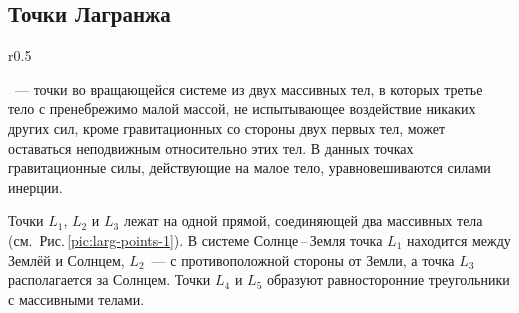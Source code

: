 \subsection{Точки Лагранжа}

\begin{wrapfigure}[12]{r}{0.5\tw}
	\centering
	\vspace{-.7pc}
	\label{pic:larg-points-1}
\end{wrapfigure}
~--- точки во вращающейся системе из двух массивных тел, в которых третье тело с пренебрежимо малой массой, не испытывающее воздействие никаких других сил, кроме гравитационных со стороны двух первых тел, может оставаться неподвижным относительно этих тел. В данных точках гравитационные силы, действующие на малое тело, уравновешиваются силами инерции.

Точки $L_1$, $L_2$ и $L_3$ лежат на одной прямой,
соединяющей два массивных тела (см.~Рис.\,\ref{pic:larg-points-1}).
В системе Солнце\,--\,Земля точка $L_1$ находится между Землёй и
Солнцем, $L_2$~--- с противоположной стороны от Земли, а точка
$L_3$ располагается за Солнцем. Точки $L_4$ и $L_5$
образуют равносторонние треугольники с массивными телами.

